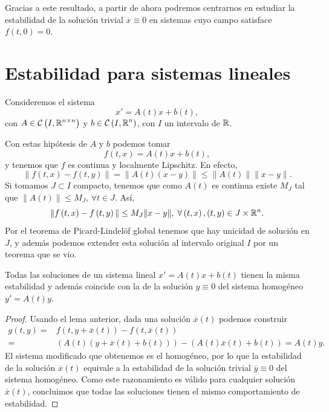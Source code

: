 \begin{observation}
Gracias a este resultado, a partir de ahora podremos centrarnos en estudiar la estabilidad de la solución trivial $\displaystyle \overline{x}\equiv 0 $ en sistemas cuyo campo satisface $\displaystyle f\left(t,0\right)=0 $.
\end{observation}

\section{Estabilidad para sistemas lineales}
Consideremos el sistema 
\[x' = A\left(t\right)x + b\left(t\right) ,\]
con $\displaystyle A\in \mathcal{C}\left(I, \mathbb{R}^{n \times n}\right) $ y $\displaystyle b \in \mathcal{C}\left(I, \mathbb{R}^{n}\right) $, con $\displaystyle I $ un intervalo de $\displaystyle \mathbb{R} $. 
\begin{observation}
Con estas hipótesis de $\displaystyle A $ y $\displaystyle b $ podemos tomar
\[f\left(t,x\right)=A\left(t\right)x + b\left(t\right) ,\]
y tenemos que $\displaystyle f $ es continua y localmente Lipschitz. En efecto, 
\[ \|f\left(t,x\right)-f\left(t,y\right)\| = \|A\left(t\right)\left(x-y\right)\| \leq \|A\left(t\right)\| \|x-y\| .\]
Si tomamos $\displaystyle J \subset I $ compacto, tenemos que como $\displaystyle A\left(t\right) $ es continua existe $\displaystyle M_{J} $ tal que $\displaystyle \|A\left(t\right)\| \leq M_{J}$, $\displaystyle \forall t \in J $. Así, 
\[ \|f\left(t,x\right)-f\left(t,y\right)\| \leq M_{J} \|x-y\|, \; \forall \left(t,x\right), \left(t,y\right)\in J \times \mathbb{R}^{n} .\]
Por el teorema de Picard-Lindelöf global tenemos que hay unicidad de solución en $\displaystyle J $, y además podemos extender esta solución al intervalo original $\displaystyle I $ por un teorema que se vio.
\end{observation}
\begin{prop}
Todas las soluciones de un sistema lineal $\displaystyle x' = A\left(t\right)x + b\left(t\right) $ tienen la misma estabilidad y además coincide con la de la solución $\displaystyle y \equiv 0 $ del sistema homogéneo $\displaystyle y' = A\left(t\right)y $. 
\end{prop}
\begin{proof}
Usando el lema anterior, dada una solución $\displaystyle \overline{x}\left(t\right) $ podemos construir 
\[
\begin{split}
	g\left(t,y\right)= & f\left(t,y+\overline{x}\left(t\right)\right)-f\left(t, \overline{x}\left(t\right)\right) \\
	= &  \left(A\left(t\right)\left(y + \overline{x}\left(t\right)+b\left(t\right)\right)\right)-\left(A\left(t\right)\overline{x}\left(t\right)+b\left(t\right)\right)=A\left(t\right)y.
\end{split}
\]
El sistema modificado que obtenemos es el homogéneo, por lo que la estabilidad de la solución $\displaystyle \overline{x}\left(t\right) $ equivale a la estabilidad de la solución trivial $\displaystyle \overline{y}\equiv 0 $ del sistema homogéneo. Como este razonamiento es válido para cualquier solución $\displaystyle \overline{x}\left(t\right) $, concluimos que todas las soluciones tienen el mismo comportamiento de estabilidad.
\end{proof}
